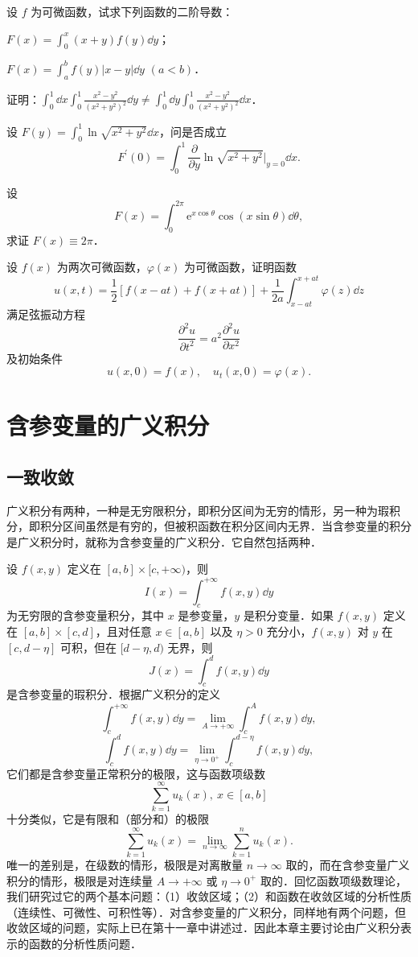 \begin{xiti}
\begin{ziti}
\end{ziti}
\item 设 $f$ 为可微函数，试求下列函数的二阶导数：
\begin{ziti}
\item $F(x)=\displaystyle\int_{0}^{x}(x+y)f(y)\dd y$；
\item $F(x)=\displaystyle\int_{a}^{b}f(y)\left|x-y\right|\dd y$ $(a<b)$．
\end{ziti}
\item 证明：$\displaystyle\int_{0}^{1}\dd x\int_{0}^{1}\frac{x^{2}-y^{2}}{(x^{2}+y^{2})^{2}}\dd y\neq\int_{0}^{1}\dd y\int_{0}^{1}\frac{x^{2}-y^{2}}{(x^{2}+y^{2})^{2}}\dd x$．
\item 设 $F(y)=\displaystyle\int_{0}^{1}\ln\sqrt{x^{2}+y^{2}}\dd x$，问是否成立
\[
F^{\prime}(0)=\int_{0}^{1}\frac{\partial}{\partial y}\ln\sqrt{x^{2}+y^{2}}\bigg|_{y=0}\dd x.
\]
\item 设
\[
F(x)=\int_{0}^{2\pi}\mathrm{e}^{x\cos\theta}\cos(x\sin\theta)\dd\theta,
\]
求证 $F(x)\equiv 2\pi$．
\item 设 $f(x)$ 为两次可微函数，$\varphi(x)$ 为可微函数，证明函数
\[
u(x,t)=\frac{1}{2}\left[f(x-at)+f(x+at)\right]+\frac{1}{2a}\int_{x-at}^{x+at}\varphi(z)\dd z
\]
满足弦振动方程
\[
\frac{\partial^{2}u}{\partial t^{2}}=a^{2}\frac{\partial^{2}u}{\partial x^{2}}
\]
及初始条件
\[
u(x,0)=f(x),\quad u_{t}(x,0)=\varphi(x).
\]
\end{xiti}

\section{含参变量的广义积分}

\subsection{一致收敛}

广义积分有两种，一种是无穷限积分，即积分区间为无穷的情形，另一种为瑕积分，即积分区间虽然是有穷的，但被积函数在积分区间内无界．当含参变量的积分是广义积分时，就称为含参变量的广义积分．它自然包括两种．

设 $f(x,y)$ 定义在 $[a,b]\times[c,+\infty)$，则
\[
I(x)=\int_{c}^{+\infty}f(x,y)\dd y
\]
为无穷限的含参变量积分，其中 $x$ 是参变量，$y$ 是积分变量．如果 $f(x,y)$ 定义在 $[a,b]\times[c,d]$，且对任意 $x\in[a,b]$ 以及 $\eta>0$ 充分小，$f(x,y)$ 对 $y$ 在 $[c,d-\eta]$ 可积，但在 $[d-\eta,d)$ 无界，则
\[
J(x)=\int_{c}^{d}f(x,y)\dd y
\]
是含参变量的瑕积分．根据广义积分的定义
\[
\int_{c}^{+\infty}f(x,y)\dd y=\lim_{A\to+\infty}\int_{c}^{A}f(x,y)\dd y,
\]
\[
\int_{c}^{d}f(x,y)\dd y=\lim_{\eta\to 0^{+}}\int_{c}^{d-\eta}f(x,y)\dd y,
\]
它们都是含参变量正常积分的极限，这与函数项级数
\[
\sum_{k=1}^{\infty}u_{k}(x),\ x\in[a,b]
\]
十分类似，它是有限和（部分和）的极限
\[
\sum_{k=1}^{\infty}u_{k}(x)=\lim_{n\to\infty}\sum_{k=1}^{n}u_{k}(x).
\]
唯一的差别是，在级数的情形，极限是对离散量 $n\to\infty$ 取的，而在含参变量广义积分的情形，极限是对连续量 $A\to+\infty$ 或 $\eta\to 0^{+}$ 取的．回忆函数项级数理论，我们研究过它的两个基本问题：（1）收敛区域；（2）和函数在收敛区域的分析性质（连续性、可微性、可积性等）．对含参变量的广义积分，同样地有两个问题，但收敛区域的问题，实际上已在第十一章中讲述过．因此本章主要讨论由广义积分表示的函数的分析性质问题．

